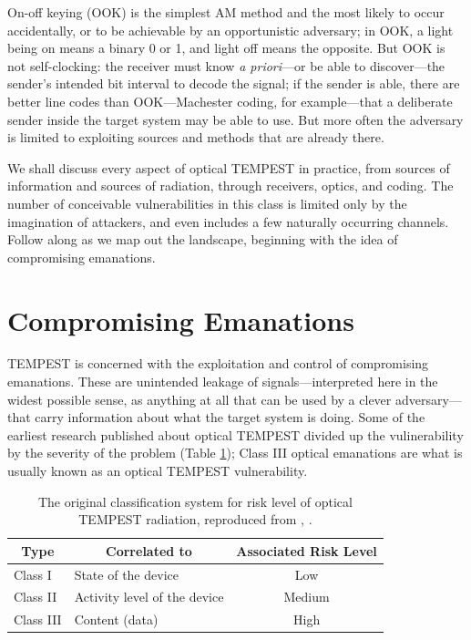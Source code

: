 \documentclass[a4paper,twoside,11pt]{book}
\begin{document}
On-off keying (OOK) is the simplest AM method and the most likely to occur
accidentally, or to be achievable by an opportunistic adversary; in OOK, a
light being on means a binary 0 or 1, and light
off means the opposite. But OOK is not self-clocking: the receiver must
know {\it a priori}---or be able to discover---the sender's intended bit
interval to decode the signal; if the sender is able, there are better line
codes than OOK---Machester coding, for example---that a deliberate sender
inside the target system may be able to use. But more often the adversary is
limited to exploiting sources and methods that are already there.

We shall discuss every aspect of optical TEMPEST in practice, from sources of
information and sources of radiation, through receivers, optics, and coding.
The number of conceivable vulnerabilities in this class is limited only by the
imagination of attackers, and even includes a few naturally occurring channels.
Follow along as we map out the landscape, beginning with the idea of
compromising emanations.
\section{Compromising Emanations}
TEMPEST is concerned with the exploitation and control of compromising
emanations. These are unintended leakage of signals---interpreted here in the
widest possible sense, as anything at all that can be used by a clever
adversary---that carry information about what the target system is doing. Some
of the earliest research published about optical TEMPEST divided up the
vulinerability by the severity of the problem (Table \ref{table:class_III});
Class III optical emanations are what is usually known as an optical TEMPEST
vulnerability.

\begin{table}[ht]
\caption{The original classification system for risk level of optical TEMPEST
radiation, reproduced from \citeauthor{Loughry2002a}, \citeyear{Loughry2002a}.}
\medskip
\label{table:class_III}
\centering
\begin{tabular}{|l|l|c|}
\hline
\multicolumn{1}{|c|}{Type} & \multicolumn{1}{|c|}{Correlated to}
  & Associated Risk Level \bigstrut \\
\hline
\renewcommand{\arraystretch}{1}
Class I & State of the device & Low \\
Class II & Activity level of the device & Medium \\
Class III & Content (data) & High \\
\hline
\end{tabular}
\end{table}
\end{document}

